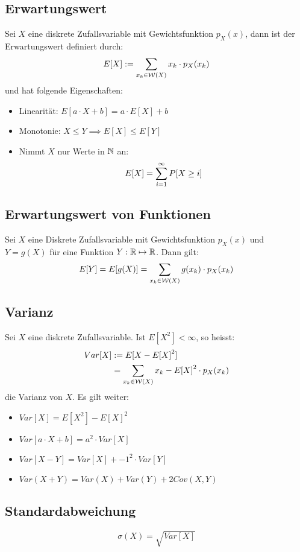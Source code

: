 \subsection*{Erwartungswert}
Sei $X$ eine diskrete Zufallsvariable mit Gewichtsfunktion $p_X (x)$, dann ist
der Erwartungswert definiert durch:
\begin{align*}
  E[X] := \sum_{x_k \in \mathcal{W} (X)} x_k \cdot p_X (x_k)
\end{align*}
und hat folgende Eigenschaften:
\begin{itemize}
  \item Linearität: $E[a \cdot X + b] = a \cdot E[X] + b$
  \item Monotonie: $X \leq Y \implies E[X] \leq E[Y]$
  \item Nimmt $X$ nur Werte in $\mathbb{N} $ an:
        \begin{align*}
          E[X] = \sum_{i = 1}^\infty P[X \geq i]
        \end{align*}
\end{itemize}
\subsection*{Erwartungswert von Funktionen}
Sei $X$ eine Diskrete Zufallsvariable mit Gewichtsfunktion $p_X (x)$ und $Y = g
  (X)$ für eine Funktion $Y: \mathbb{R} \mapsto \mathbb{R}$. Dann gilt:
\begin{align*}
  E[Y] = E[g (X)] = \sum_{x_k \in \mathcal{W} (X)} g (x_k) \cdot p_X (x_k)
\end{align*}
\subsection*{Varianz}
Sei $X$ eine diskrete Zufallsvariable. Ist $E[X^2] < \infty$, so heisst:
\begin{align*}
  Var[X] & := E[ {X - E[X]}^2]                                     \\
         & = \sum_{x_k \in \mathcal{W} (X)}  {x_k - E[X]}^2 \cdot p_X (x_k)
\end{align*}
die Varianz von $X$. Es gilt weiter:
\begin{itemize}
  \item $Var[X] = E[X^2] - {E[X]}^2$
  \item $Var[a \cdot X + b] = a^2 \cdot Var[X]$
  \item $Var[X - Y] = Var[X] +  {-1}^2 \cdot Var[Y]$
  \item $Var(X+Y) = Var(X) + Var(Y) + 2Cov(X,Y)$
\end{itemize}
\subsection*{Standardabweichung}
$$
  \sigma (X) = \sqrt{Var[X]}
$$
